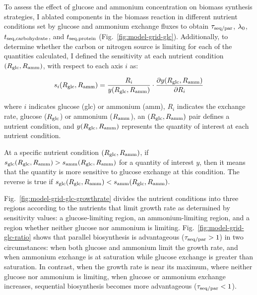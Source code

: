 To assess the effect of glucose and ammonium concentration on biomass synthesis strategies, I ablated components in the biomass reaction in different nutrient conditions set by glucose and ammonium exchange fluxes
to obtain $\tau_{\mathrm{seq}/\mathrm{par}}$, $\lambda_{0}$, $t_{\mathrm{seq},\mathrm{carbohydrate}}$, and $t_{\mathrm{seq},\mathrm{protein}}$ (Fig.\ \ref{fig:model-grid-glc}).
Additionally, to determine whether the carbon or nitrogen source is limiting for each of the quantities calculated, I defined the sensitivity at each nutrient condition $(R_{\mathrm{glc}}, R_{\mathrm{amm}})$, with respect to each axis $i$ as:

\begin{equation}
  s_{i}(R_{\mathrm{glc}}, R_{\mathrm{amm}}) = \frac{R_{i}}{y(R_{\mathrm{glc}}, R_{\mathrm{amm}})} \cdot \frac{\partial y(R_{\mathrm{glc}}, R_{\mathrm{amm}})}{\partial R_{i}}
  \label{eq:model-susceptibility}
\end{equation}

where
$i$ indicates glucose (glc) or ammonium (amm),
$R_{i}$ indicates the exchange rate, glucose ($R_{\mathrm{glc}}$) or ammonium ($R_{\mathrm{amm}}$),
an $(R_{\mathrm{glc}}, R_{\mathrm{amm}})$ pair defines a nutrient condition, and
$y(R_{\mathrm{glc}}, R_{\mathrm{amm}})$ represents the quantity of interest at each nutrient condition.

At a specific nutrient condition $(R_{\mathrm{glc}}, R_{\mathrm{amm}})$, if $s_{\mathrm{glc}}(R_{\mathrm{glc}}, R_{\mathrm{amm}}) > s_{\mathrm{amm}}(R_{\mathrm{glc}}, R_{\mathrm{amm}})$ for a quantity of interest $y$, then it means that the quantity is more sensitive to glucose exchange at this condition.
The reverse is true if $s_{\mathrm{glc}}(R_{\mathrm{glc}}, R_{\mathrm{amm}}) < s_{\mathrm{amm}}(R_{\mathrm{glc}}, R_{\mathrm{amm}})$.

Fig.\ \ref{fig:model-grid-glc-growthrate} divides the nutrient conditions into three regions according to the nutrients that limit growth rate as determined by sensitivity values: a glucose-limiting region, an ammonium-limiting region, and a region whether neither glucose nor ammonium is limiting.
Fig.\ \ref{fig:model-grid-glc-ratio} shows that parallel biosynthesis is advantageous ($\tau_{\mathrm{seq}/\mathrm{par}} > 1$) in two circumstances: when both glucose and ammonium limit the growth rate, and when ammonium exchange is at saturation while glucose exchange is greater than saturation.
In contrast, when the growth rate is near its maximum, where neither glucose nor ammonium is limiting, when glucose or ammonium exchange increases, sequential biosynthesis becomes more advantageous ($\tau_{\mathrm{seq}/\mathrm{par}} < 1$).

